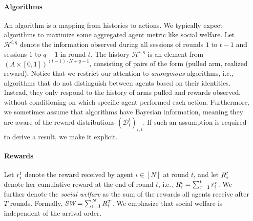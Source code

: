 \paragraph{Algorithms} An algorithm is a mapping from histories to actions. We typically expect algorithms to maximize some aggregated agent metric like social welfare. Let $\mathcal H^{t,q}$ denote the information observed during all sessions of rounds $1$ to $t-1$ and sessions $1$ to $q-1$ in round $t$.  The history $\mathcal H^{t,q}$ is an element from $(A \times [0,1])^{(t-1) \cdot N +q-1}$, consisting of pairs of the form (pulled arm, realized reward). Notice that we restrict our attention to \emph{anonymous} algorithms, i.e., algorithms that do not distinguish between agents based on their identities. Instead, they only respond to the history of arms pulled and rewards observed, without conditioning on which specific agent performed each action.
Furthermore, we sometimes assume that algorithms have Bayesian information, meaning they are aware of the reward distributions $(\mathcal{D}^t_i)_{i,t}$. If such an assumption is required to derive a result, we make it explicit. %


\paragraph{Rewards} Let $r_{i}^t$ denote the reward received by agent $i \in [N]$ at round $t$, and let $R_{i}^t$ denote her cumulative reward at the end of round $t$, i.e., $R_{i}^t = \sum_{\tau=1}^{t}{r^{\tau}_{i}}$. We further denote the \emph{social welfare} as the sum of the rewards all agents receive after $T$ rounds. Formally, $\textit{SW}=\sum^{N}_{i=1}{R^T_i}$. We emphasize that social welfare is independent of the arrival order. 


